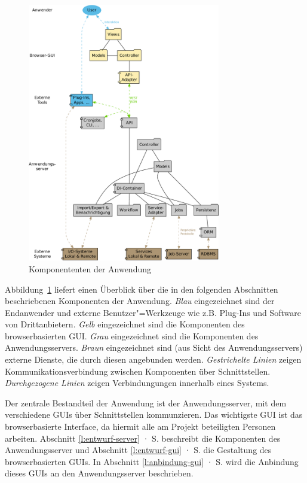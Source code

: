 \begin{figure}[htb]
\begin{center}
\includegraphics[width=0.75\textwidth]{media/komponenten.pdf}
\end{center}
\caption{Komponententen der Anwendung}
\label{chart:komponenten}
\end{figure}

Abbildung~\ref{chart:komponenten} liefert einen Überblick über die in den folgenden Abschnitten beschriebenen Komponenten der Anwendung. \emph{Blau} eingezeichnet sind der Endanwender und externe Benutzer"=Werkzeuge wie z.B. Plug-Ins und Software von Drittanbietern. \emph{Gelb} eingezeichnet sind die Komponenten des browserbasierten GUI. \emph{Grau} eingezeichnet sind die Komponenten des Anwendungsservers. \emph{Braun} eingezeichnet sind (aus Sicht des Anwendungsservers) externe Dienste, die durch diesen angebunden werden. \emph{Gestrichelte Linien} zeigen Kommunikationsverbindung zwischen Komponenten über Schnittstellen. \emph{Durchgezogene Linien} zeigen Verbindungungen innerhalb eines Systems.

Der zentrale Bestandteil der Anwendung ist der Anwendungsserver, mit dem verschiedene GUIs über Schnittstellen kommunzieren. Das wichtigste GUI ist das browserbasierte Interface, da hiermit alle am Projekt beteiligten Personen arbeiten. Abschnitt \ref{l:entwurf-server} · S.\pageref{l:entwurf-server} beschreibt die Komponenten des Anwendungsserver und Abschnitt \ref{l:entwurf-gui} · S.\pageref{l:entwurf-gui} die Gestaltung des browserbasierten GUIs. In Abschnitt \ref{l:anbindung-gui} · S.\pageref{l:anbindung-gui} wird die Anbindung dieses GUIs an den Anwendungsserver beschrieben.

